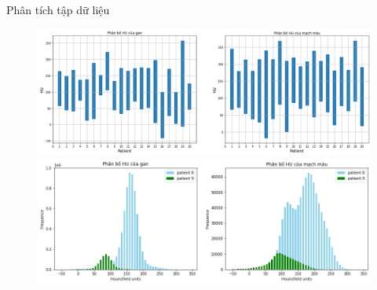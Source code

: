 \documentclass[
	10pt,                %
	aspectratio=169,     %
]{beamer}
\begin{document}
	\begin{frame}[noframenumbering]{Phân tích tập dữ liệu}
	    \vspace{-0.35cm}
	    \begin{figure}[H]
        	\begin{center}
        		\includegraphics[scale=0.26]{Presentation_template/figures/dataset/hu_dist.png}
        	\end{center}
        	\vspace{-0.3cm}
        	\begin{center}
        		\includegraphics[scale=0.35]{Presentation_template/figures/dataset/compare_2patient.png}
        	\end{center}
        \end{figure}
	\end{frame}
	
\end{document}
